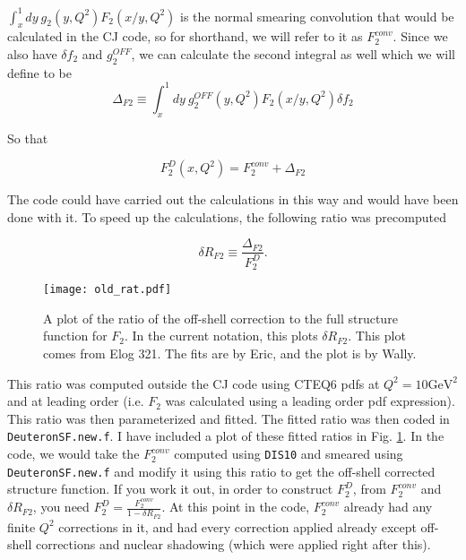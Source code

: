 \documentclass[12pt]{article}
\begin{document}
$\int_{x}^1 dy~g_2(y,Q^2) F_2(x/y,Q^2)$ is the normal smearing convolution that would be calculated in the CJ code, so for shorthand, we will refer to it as $F_2^{conv}$.  Since we also have $\delta f_2$ and $g_2^{OFF}$, we can calculate the second integral as well which we will define to be
\begin{equation}
\label{eq:DeltaF2}
\Delta_{F2} \equiv \int_x^1 dy~g_2^{OFF}(y,Q^2)F_2(x/y,Q^2)\delta f_2
\end{equation}

So that 

\begin{equation}
\label{eq:F2smear3}
F_2^D(x,Q^2)=F_2^{conv}+\Delta_{F2}
\end{equation}

The code could have carried out the calculations in this way and would have been done with it.  To speed up the calculations, the following ratio was precomputed

\begin{equation}
\label{eq:deltaR}
\delta R_{F2}\equiv \frac{\Delta_{F2}}{F_2^D}.
\end{equation}

\begin{figure}[t]
\centering
\texttt{[image: old\_rat.pdf]}
\caption{A plot of the ratio of the off-shell correction to the full structure function for $F_2$.  In the current notation, this plots $\delta R_{F2}$.  This plot comes from Elog 321.  The fits are by Eric, and the plot is by Wally.}
\label{fig:old_rat}
\end{figure}

This ratio was computed outside the CJ code using CTEQ6 pdfs at $Q^2 = 10 \text{GeV}^2$ and at leading order (i.e. $F_2$ was calculated using a leading order pdf expression).  This ratio was then parameterized and fitted.  The fitted ratio was then coded in \verb+DeuteronSF.new.f+.  I have included a plot of these fitted ratios in Fig. \ref{fig:old_rat}.  In the code, we would take the $F_2^{conv}$ computed using \verb+DIS10+ and smeared using \verb+DeuteronSF.new.f+ and modify it using this ratio to get the off-shell corrected structure function.  If you work it out, in order to construct $F_2^D$, from $F_2^{conv}$ and $\delta R_{F2}$, you need $F_2^D = \frac{F_2^{conv}}{1-\delta R_{F2}}$.  At this point in the code, $F_2^{conv}$ already had any finite $Q^2$ corrections in it, and had every correction applied already except off-shell corrections and nuclear shadowing (which were applied right after this).
\end{document}
